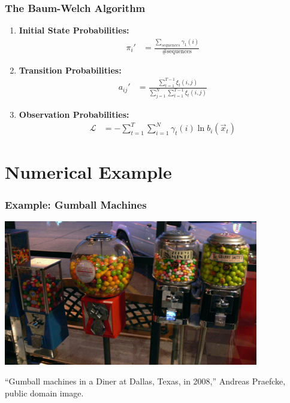 \documentclass{beamer}
\begin{document}
\begin{frame}
  \frametitle{The Baum-Welch Algorithm}

  \begin{enumerate}
  \item {\bf Initial State Probabilities:}
    \begin{align*}
      \pi_i' &=\frac{\sum_{sequences} \gamma_1(i)}{\mbox{\# sequences}}
    \end{align*}
  \item {\bf Transition Probabilities:}
    \begin{align*}
      a_{ij}' &=\frac{\sum_{t=1}^{T-1} \xi_t(i,j)}{\sum_{j=1}^N\sum_{t=1}^{T-1}\xi_t(i,j)}
    \end{align*}
  \item {\bf Observation Probabilities:} 
    \begin{align*}
      {\mathcal L} &= -\sum_{t=1}^T\sum_{i=1}^N  \gamma_t(i)\ln b_{i}(\vec{x}_t)
    \end{align*}
  \end{enumerate}
\end{frame}

\section[Example]{Numerical Example}
\setcounter{subsection}{1}

\begin{frame}
  \frametitle{Example: Gumball Machines}
  \centerline{\includegraphics[height=2.5in]{Gumball_machines_Dallas_2008.jpg}}
  \begin{tiny}
    ``Gumball machines in a Diner at Dallas, Texas, in 2008,'' Andreas Praefcke, public domain image.
  \end{tiny}
\end{frame}
\end{document}
